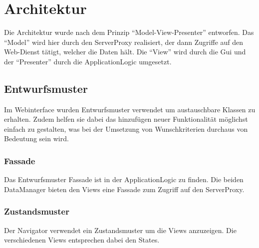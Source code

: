 \section{Architektur}
Die Architektur wurde nach dem Prinzip ``Model-View-Presenter'' entworfen. Das ``Model'' wird hier durch den ServerProxy realisiert, der dann Zugriffe auf den Web-Dienst tätigt, welcher die Daten hält. Die ``View'' wird durch die Gui und der ``Presenter'' durch die ApplicationLogic umgesetzt.

\subsection{Entwurfsmuster}
Im Webinterface wurden Entwurfsmuster verwendet um austauschbare Klassen zu erhalten. Zudem helfen sie dabei das hinzufügen neuer Funktionalität möglichst einfach zu gestalten, was bei der Umsetzung von Wunschkriterien durchaus von Bedeutung sein wird.

\subsubsection{Fassade}
Das Entwurfsmuster Fassade ist in der ApplicationLogic zu finden. Die beiden DataManager bieten den Views eine Fassade zum Zugriff auf den ServerProxy.

\subsubsection{Zustandsmuster}
Der Navigator verwendet ein Zustandsmuster um die Views anzuzeigen. Die verschiedenen Views entsprechen dabei den States.
